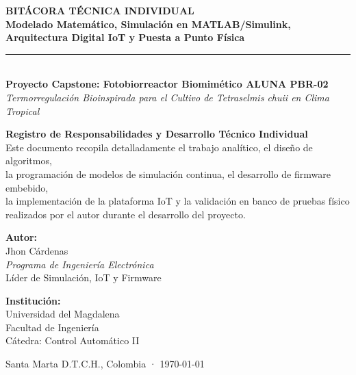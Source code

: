 \documentclass[12pt,letterpaper]{article}
\begin{document}
\begin{titlepage}
    \centering
    \vspace*{1.5cm}
    
    {\Huge \textbf{BITÁCORA TÉCNICA INDIVIDUAL}}\\[0.5cm]
    {\LARGE \textbf{Modelado Matemático, Simulación en MATLAB/Simulink,}}\\[0.2cm]
    {\LARGE \textbf{Arquitectura Digital IoT y Puesta a Punto Física}}\\[0.8cm]
    
    \rule{0.85\textwidth}{1.2pt}\\[0.8cm]
    
    {\Large \textbf{Proyecto Capstone: Fotobiorreactor Biomimético ALUNA PBR-02}}\\[0.3cm]
    {\large \textit{Termorregulación Bioinspirada para el Cultivo de Tetraselmis chuii en Clima Tropical}}\\[1.5cm]
    
    \begin{minipage}{0.85\textwidth}
        \centering
        \textbf{\large Registro de Responsabilidades y Desarrollo Técnico Individual}\\
        \vspace{0.3cm}
        \small
        Este documento recopila detalladamente el trabajo analítico, el diseño de algoritmos,\\
        la programación de modelos de simulación continua, el desarrollo de firmware embebido,\\
        la implementación de la plataforma IoT y la validación en banco de pruebas físico\\
        realizados por el autor durante el desarrollo del proyecto.
    \end{minipage}
    
    \vfill
    
    \begin{minipage}{0.48\textwidth}
        \begin{flushleft} \large
            \textbf{Autor:}\\
            Jhon Cárdenas\\
            \textit{Programa de Ingeniería Electrónica}\\
            Líder de Simulación, IoT y Firmware
        \end{flushleft}
    \end{minipage}
    \hfill
    \begin{minipage}{0.48\textwidth}
        \begin{flushright} \large
            \textbf{Institución:}\\
            Universidad del Magdalena\\
            Facultad de Ingeniería\\
            Cátedra: Control Automático II
        \end{flushright}
    \end{minipage}
    
    \vspace{1.5cm}
    {\large Santa Marta D.T.C.H., Colombia · \today}
    \vspace*{0.5cm}
\end{titlepage}
\end{document}
